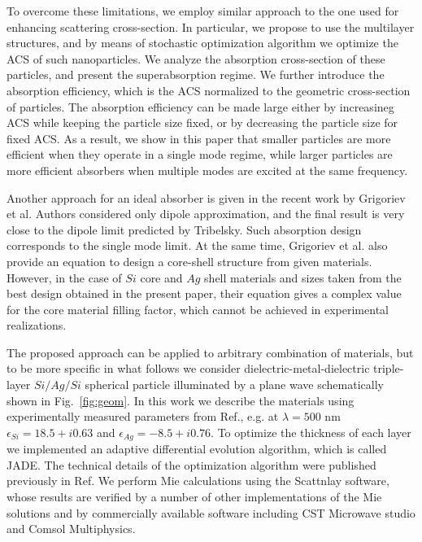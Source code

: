 \documentclass[twoside,twocolumn,9pt]{article}
\begin{document}
To overcome these limitations, we employ similar approach to the one
used for enhancing scattering cross-section.\cite{Fan-2011} In
particular, we propose to use the multilayer structures, and by means
of stochastic optimization algorithm\cite{Jingqiao-JADE-2009} we
optimize the ACS of such nanoparticles. We analyze the absorption
cross-section of these particles, and present the superabsorption
regime. We further introduce the absorption efficiency, which is the
ACS normalized to the geometric cross-section of particles.  The
absorption efficiency can be made large either by increasineg ACS while
keeping the particle size fixed, or by decreasing the particle size
for fixed ACS. As a result, we show in this paper that smaller
particles are more efficient when they operate in a single mode
regime, while larger particles are more efficient absorbers when
multiple modes are excited at the same frequency.

Another approach for an ideal absorber is given in the recent work by
Grigoriev et al.\cite{Grigoriev-2015} Authors considered only dipole
approximation, and the final result is very close to the dipole limit
predicted by Tribelsky.\cite{Tribelsky-2011}  Such absorption design
corresponds to the single mode limit.  At the same time, Grigoriev et
al.\cite{Grigoriev-2015} also provide an equation to design a
core-shell structure from given materials. However, in the case of
$Si$ core and $Ag$ shell materials and sizes taken from the best
design obtained in the present paper, their equation gives a complex
value for the core material filling factor, which cannot be achieved
in experimental realizations.

\begin{figure}[h]
\end{figure}

The proposed approach can be applied to arbitrary combination of
materials, but to be more specific in what follows we consider
dielectric-metal-dielectric triple-layer $Si/Ag/Si$ spherical particle
illuminated by a plane wave schematically shown in
Fig.~\ref{fig:geom}. In this work we describe the materials using
experimentally measured parameters from Ref.,\cite{palik-1997}
e.g. at $\lambda = 500$ nm $\epsilon_{Si} = 18.5 + i0.63$ and
$\epsilon_{Ag} = -8.5 + i0.76$.  To optimize the thickness of each
layer we implemented\cite{JADE-web} an adaptive differential
evolution algorithm,\cite{Storn-DE-first-1997} which is called
JADE.\cite{Jingqiao-JADE-2009}  The technical details of the
optimization algorithm were published previously in
Ref.\cite{Ladutenko-2014} We perform Mie calculations using the
Scattnlay software,\cite{Pena-scattnlay-2009,Scattnlay-web} whose
results are verified by a number of other implementations of the Mie
solutions and by commercially available software including CST
Microwave studio\cite{CST-web} and Comsol Multiphysics.\cite{Comsol-web}
\end{document}
